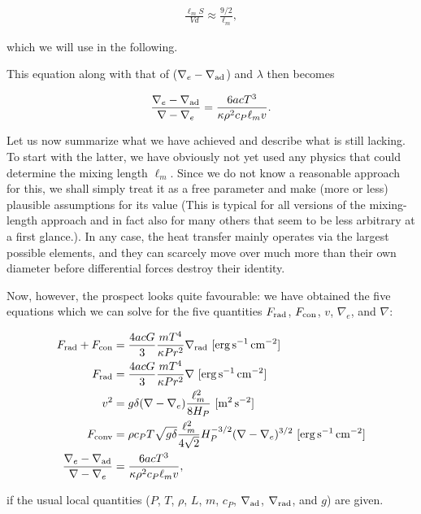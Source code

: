 \documentclass[a4paper,10pt]{article}
\begin{document}
\begin{align*}
    \frac{\ell_mS}{Vd} \approx \frac{9/2}{\ell_m},
\end{align*}

{\noindent}which we will use in the following.

{\noindent}This equation along with that of ($\nabla_e-\nabla_{\rm ad}$) and $\lambda$ then becomes

\begin{align*}
    \frac{\nabla_e-\nabla_{\rm ad}}{\nabla-\nabla_e} = \frac{6acT^3}{\kappa\rho^2c_P\ell_mv}.
\end{align*}

{\noindent}Let us now summarize what we have achieved and describe what is still lacking. To start with the latter, we have obviously not yet used any physics that could determine the mixing length $\ell_m$. Since we do not know a reasonable approach for this, we shall simply treat it as a free parameter and make (more or less) plausible assumptions for its value (This is typical for all versions of the mixing-length approach and in fact also for many others that seem to be less arbitrary at a first glance.). In any case, the heat transfer mainly operates via the largest possible elements, and they can scarcely move over much more than their own diameter before differential forces destroy their identity.

{\noindent}Now, however, the prospect looks quite favourable: we have obtained the five equations which we can solve for the five quantities $F_{\rm rad}$, $F_{\rm con}$, $v$, $\nabla_e$, and $\nabla$:

\begin{align*}
    F_{\rm rad} + F_{\rm con} &= \frac{4acG}{3}\frac{mT^4}{\kappa Pr^2} \nabla_{\rm rad} ~ [{\rm erg\,s^{-1}\,cm^{-2}}] \\
    F_{\rm rad} &= \frac{4acG}{3}\frac{mT^4}{\kappa Pr^2} \nabla ~ [{\rm erg\,s^{-1}\,cm^{-2}}] \\
    v^2 &= g\delta(\nabla-\nabla_e)\frac{\ell_m^2}{8H_P} ~ [{\rm m^2\,s^{-2}}] \\
    F_{\rm conv} &= \rho c_PT\sqrt{g\delta} \frac{\ell_m^2}{4\sqrt{2}} H_P^{-3/2}(\nabla-\nabla_e)^{3/2} ~ [{\rm erg\,s^{-1}\,cm^{-2}}] \\
    \frac{\nabla_e-\nabla_{\rm ad}}{\nabla-\nabla_e} &= \frac{6acT^3}{\kappa\rho^2c_P\ell_mv},
\end{align*}

{\noindent}if the usual local quantities ($P$, $T$, $\rho$, $L$, $m$, $c_P$, $\nabla_{\rm ad}$, $\nabla_{\rm rad}$, and $g$) are given.
\end{document}
